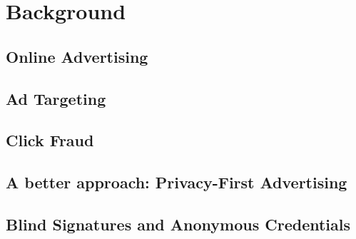 \section{Background}
\label{s:bg}

\subsection{Online Advertising}

\subsection{Ad Targeting}

\subsection{Click Fraud}

\subsection{A better approach: Privacy-First Advertising}

\subsection{Blind Signatures and Anonymous Credentials}

